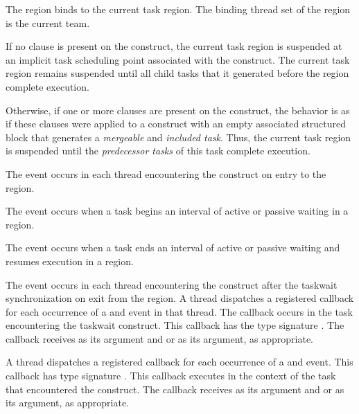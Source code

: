 \binding
The  region binds to the current task region. The binding thread set of the
 region is the current team.

\descr

If no  clause is present on the  construct, the
current task region is suspended at an implicit task scheduling point
associated with the construct. The current task region remains suspended until
all child tasks that it generated before the  region complete
execution.

Otherwise, if one or more  clauses are present on the
 construct, the behavior is as if these clauses were applied to
a  construct with an empty associated structured block that
generates a \emph{mergeable} and \emph{included task}. Thus, the current task region is
suspended until the \emph{predecessor tasks} of this task complete execution.

\events
The  event occurs in each thread encountering the
 construct on entry to the  region.

The  event occurs when a task begins an interval of active or passive waiting
in a  region.

The  event occurs when a task ends an interval of active or passive waiting
and resumes execution in a  region.

The  event occurs in each thread encountering the
 construct after the taskwait synchronization on exit from the
 region.
\tools
A thread dispatches a registered 
callback for each occurrence of a  and  event
in that thread.  The callback occurs in the task encountering
the taskwait construct.  This callback has the type signature
.
The callback receives
 as its  argument and
 or 
as its  argument, as appropriate.

A thread dispatches a registered
 callback
for each occurrence of a  and  event.
This callback has type signature .
This callback executes in the context of the task that encountered the
 construct. The callback receives
 as its  argument and
 or 
as its  argument, as appropriate.

